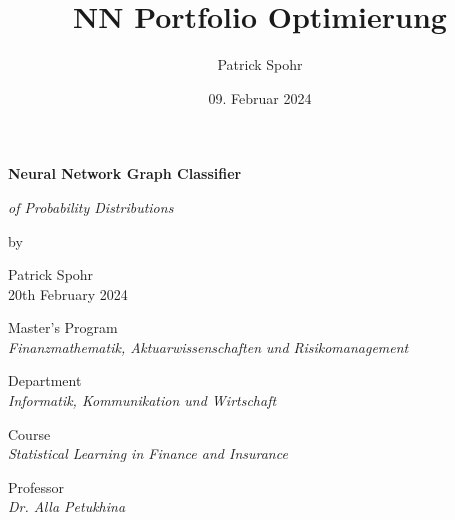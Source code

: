 \documentclass[12pt]{article}
\title{NN Portfolio Optimierung}
\date{09. Februar 2024}
\author{Patrick Spohr}
\begin{document}
    \begin{titlepage}
        
        \centering
        \Huge \textbf{Neural Network Graph Classifier}

        \vspace{7mm}
        
        \centering
        \Large \textit{of Probability Distributions} 

        \vspace{7mm}

        \centering
        \large by

        \vspace{7mm}

        \large Patrick Spohr
        \vspace{2mm}
        \\ 20th February 2024

        \vspace{30mm}

        \centering
        \large Master’s Program
        \vspace{1mm}
        \\ \normalsize \textit{Finanzmathematik, Aktuarwissenschaften und Risikomanagement} 

        \vspace{5mm}

        \centering
        \large Department
        \vspace{1mm}
        \\ \normalsize \textit{Informatik, Kommunikation und Wirtschaft} 

        \vspace{5mm}

        \centering
        \large Course 
        \vspace{1mm}       
        \\ \normalsize \textit{Statistical Learning in Finance and Insurance} 

        \vspace{5mm}

        \centering
        \large Professor
        \vspace{1mm}
        \\ \normalsize \textit{Dr. Alla Petukhina} 


    \end{titlepage}

    \hypertarget{Table of Contents}{\tableofcontents}

    \newpage
\end{document}
